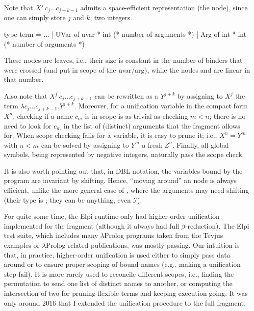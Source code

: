 \documentclass{these-ISSS}
\newenvironment{ocamlcode}
  {\VerbatimEnvironment\begin{ocamlbox}\begin{xocamlcode}}{\end{xocamlcode}
\end{ocamlbox}}
\begin{document}
Note that $X^j\ c_j \ldots c_{j + k-1}$ admits a space-efficient
representation (the  node), since one can simply store $j$ and
$k$, two integers.

\begin{ocamlcode}
type term =
  ...
  | UVar of uvar * int (* number of arguments *)
  | Arg  of int  * int (* number of arguments *)
\end{ocamlcode}


\noindent
These nodes are leaves, i.e., their size is constant in the number of binders
that were crossed (and put in scope of the uvar/arg), while the nodes
 and  are linear in that number.


Also note that $X^j\ c_j \ldots c_{j + k-1}$ can be rewritten as a $Y^{j+k}$
by assigning to $X^j$ the term $\lambda c_j \ldots c_{j + k-1}. Y^{j+k}$.
Moreover, for a unification variable in the compact form $X^n$, checking if a
name $c_m$ is in scope is as trivial as checking $m < n$; there is no need to
look for $c_m$ in the list of (distinct) arguments that the \theotherfragment
fragment allows for. When scope checking fails for a variable, it is easy to
prune it; i.e., $X^n = Y^m$ with $n < m$ can be solved by assigning to $Y^m$ a
fresh $Z^n$. Finally, all global symbols, being represented by negative
integers, naturally pass the scope check.


It is also worth pointing out that, in DBL notation, the variables bound by the
program are invariant by shifting. Hence, ``moving around'' an  node
is always efficient, unlike the more general case of , where
the arguments may need shifting (their type is ; they can be
anything, even $\mathcal{I}$).


For quite some time, the Elpi runtime only had higher-order unification
implemented for the \thefragment fragment (although it always had full
$\beta$-reduction). The Elpi test suite, which includes many $\lambda$Prolog
programs taken from the Teyjus examples or $\lambda$Prolog-related
publications, was mostly passing. Our intuition is that, in practice,
higher-order unification is used either to simply pass data around or to
ensure proper scoping of bound names (e.g., making a unification step fail).
It is more rarely used to reconcile different scopes, i.e., finding the
permutation to send one list of distinct names to another, or computing the
intersection of two for pruning flexible terms and keeping execution going.
It was only around 2016 that I extended the unification procedure to the full
\theotherfragment fragment.
\end{document}
